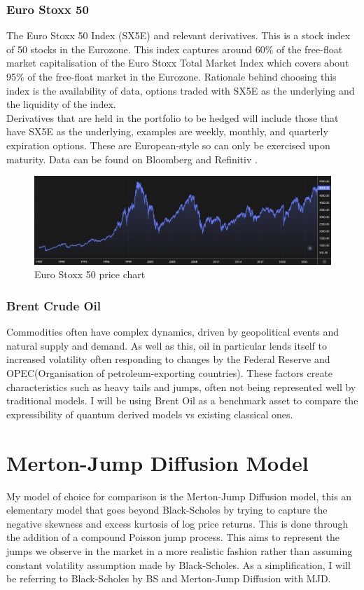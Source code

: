 \documentclass[12pt]{article}
\numberwithin{equation}{section}
\begin{document}
\subsubsection{Euro Stoxx 50}
The Euro Stoxx 50 Index (SX5E) and relevant derivatives. This is a stock index of 50 stocks in the Eurozone. 
This index captures around 60\% of the free-float market capitalisation of the 
Euro Stoxx Total Market Index which covers about 95\% of the free-float market 
in the Eurozone\autocite{a2021_euro}. Rationale behind choosing this index is the availability of data,
options traded with SX5E as the underlying and the liquidity of the index.
\\
Derivatives that are held in the portfolio to be hedged will include those that 
have SX5E as the underlying, examples are weekly, monthly, and quarterly
expiration options. These are European-style so can only be exercised upon 
maturity. Data can be found on Bloomberg\autocite{bloomberg_2023_bloomberg} and Refinitiv
\autocite{lseg}.
\begin{figure}[h]
    \centering
    \includegraphics[scale=0.35]{sx5e.png}
    \caption{Euro Stoxx 50 price chart}
\end{figure}

\subsubsection{Brent Crude Oil}
Commodities often have complex dynamics, driven by geopolitical events and natural 
supply and demand. As well as this, oil in particular lends itself to increased
volatility often responding to changes by the Federal Reserve and OPEC(Organisation 
of petroleum-exporting countries). These factors create characteristics such as 
heavy tails and jumps, often not being represented well by traditional models. 
I will be using Brent Oil as a benchmark asset to compare the expressibility of 
quantum derived models vs existing classical ones. 
\clearpage

\section{Merton-Jump Diffusion Model}
My model of choice for comparison is the Merton-Jump Diffusion model, this an 
elementary model that goes beyond Black-Scholes by trying to capture the negative
skewness and excess kurtosis of log price returns. This is done through the 
addition of a compound Poisson jump process. This aims to represent the jumps 
we observe in the market in a more realistic fashion rather than assuming constant 
volatility assumption made by Black-Scholes. As a simplification, I will be referring 
to Black-Scholes by BS and Merton-Jump Diffusion with MJD.
\end{document}
